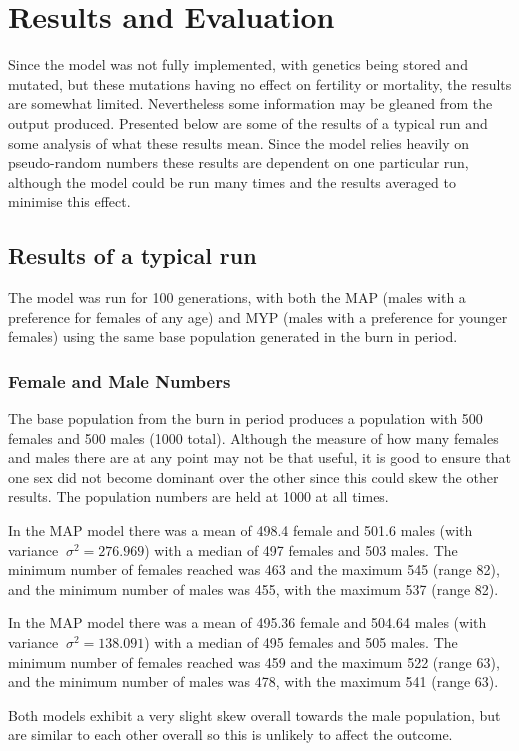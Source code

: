 \documentclass[authoryearcitations]{UoYCSproject}
\begin{document}
\chapter{Results and Evaluation}
\label{cha:Results and Evaluation}
Since the model was not fully implemented, with genetics being stored and mutated, but these mutations having no effect on fertility or mortality, the results are somewhat limited. Nevertheless some information may be gleaned from the output produced. Presented below are some of the results of a typical run and some analysis of what these results mean. Since the model relies heavily on pseudo-random numbers these results are dependent on one particular run, although the model could be run many times and the results averaged to minimise this effect.

\section{Results of a typical run}
The model was run for 100 generations, with both the MAP (males with a preference for females of any age) and MYP (males with a preference for younger females) using the same base population generated in the burn in period. 

\subsection{Female and Male Numbers}
The base population from the burn in period produces a population with 500 females and 500 males (1000 total). Although the measure of how many females and males there are at any point may not be that useful, it is good to ensure that one sex did not become dominant over the other since this could skew the other results. The population numbers are held at 1000 at all times.

In the MAP model there was a mean of 498.4 female and 501.6 males (with variance $\ \sigma^2 = 276.969 $) with a median of 497 females and 503 males. The minimum number of females reached was 463 and the maximum 545 (range 82), and the minimum number of males was 455, with the maximum 537 (range 82).

In the MAP model there was a mean of 495.36 female and 504.64 males (with variance $\ \sigma^2 = 138.091 $) with a median of 495 females and 505 males. The minimum number of females reached was 459 and the maximum 522 (range 63), and the minimum number of males was 478, with the maximum 541 (range 63).

Both models exhibit a very slight skew overall towards the male population, but are similar to each other overall so this is unlikely to affect the outcome.
\end{document}
